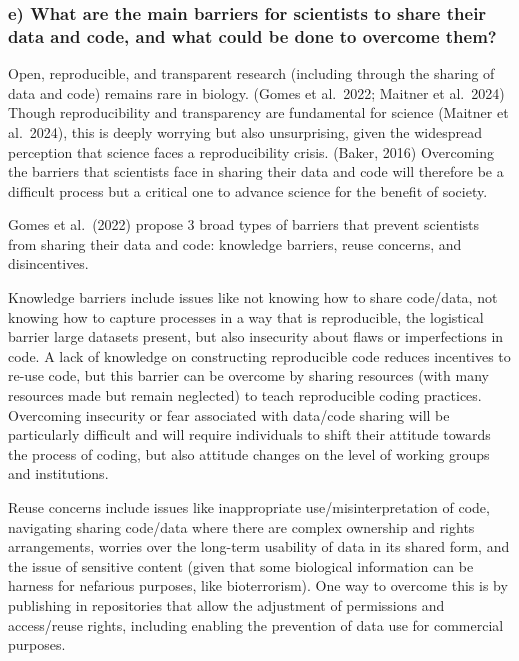 \documentclass[
]{article}
\begin{document}
\subsubsection{e) What are the main barriers for scientists to share
their data and code, and what could be done to overcome
them?}\label{e-what-are-the-main-barriers-for-scientists-to-share-their-data-and-code-and-what-could-be-done-to-overcome-them}

Open, reproducible, and transparent research (including through the
sharing of data and code) remains rare in biology. (Gomes et al.~2022;
Maitner et al.~2024) Though reproducibility and transparency are
fundamental for science (Maitner et al.~2024), this is deeply worrying
but also unsurprising, given the widespread perception that science
faces a reproducibility crisis. (Baker, 2016) Overcoming the barriers
that scientists face in sharing their data and code will therefore be a
difficult process but a critical one to advance science for the benefit
of society.

Gomes et al.~(2022) propose 3 broad types of barriers that prevent
scientists from sharing their data and code: knowledge barriers, reuse
concerns, and disincentives.

Knowledge barriers include issues like not knowing how to share
code/data, not knowing how to capture processes in a way that is
reproducible, the logistical barrier large datasets present, but also
insecurity about flaws or imperfections in code. A lack of knowledge on
constructing reproducible code reduces incentives to re-use code, but
this barrier can be overcome by sharing resources (with many resources
made but remain neglected) to teach reproducible coding practices.
Overcoming insecurity or fear associated with data/code sharing will be
particularly difficult and will require individuals to shift their
attitude towards the process of coding, but also attitude changes on the
level of working groups and institutions.

Reuse concerns include issues like inappropriate use/misinterpretation
of code, navigating sharing code/data where there are complex ownership
and rights arrangements, worries over the long-term usability of data in
its shared form, and the issue of sensitive content (given that some
biological information can be harness for nefarious purposes, like
bioterrorism). One way to overcome this is by publishing in repositories
that allow the adjustment of permissions and access/reuse rights,
including enabling the prevention of data use for commercial purposes.
\end{document}
